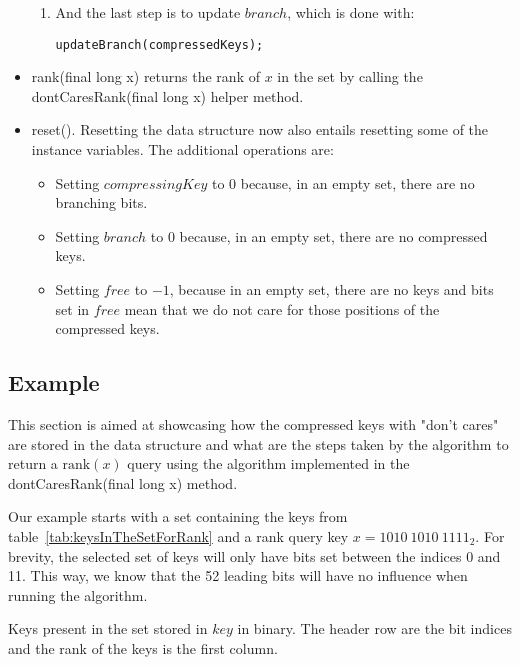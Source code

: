 \begin{itemize}
\begin{enumerate}
        \item
        And the last step is to update $branch$, which is done with:
        \begin{lstlisting}
updateBranch(compressedKeys);
        \end{lstlisting}
    \end{enumerate}
    
    \item
    {\ttfamily rank(final long x)} returns the rank of $x$ in the set by calling the {\ttfamily dontCaresRank(final long x)} helper method.
    
    \item
    {\ttfamily reset()}.
    Resetting the data structure now also entails resetting some of the instance variables. The additional operations are:
    \begin{itemize}
        \item
        Setting $compressingKey$ to $0$ because, in an empty set, there are no branching bits.
        
        \item
        Setting $branch$ to $0$ because, in an empty set, there are no compressed keys.
        
        \item
        Setting $free$ to $-1$, because in an empty set, there are no keys and bits set in $free$ mean that we do not care for those positions of the compressed keys.
    \end{itemize}
\end{itemize}

\subsection{Example} \label{sec:dontCaresRankExample}

This section is aimed at showcasing how the compressed keys with "don't cares" are stored in the data structure and what are the steps taken by the algorithm to return a $\text{rank}(x)$ query using the algorithm implemented in the {\ttfamily dontCaresRank(final long x)} method.

Our example starts with a set containing the keys from table~\ref{tab:keysInTheSetForRank} and a rank query key $x = 1010\ 1010\ 1111_2$. For brevity, the selected set of keys will only have bits set between the indices 0 and 11. This way, we know that the 52 leading bits will have no influence when running the algorithm.

\begin{table}[H]
\centering

\caption[Example of keys present in the set stored in $key$ in binary]{Keys present in the set stored in $key$ in binary. The header row are the bit indices and the rank of the keys is the first column.}
\label{tab:keysInTheSetForRank}
\end{table}

